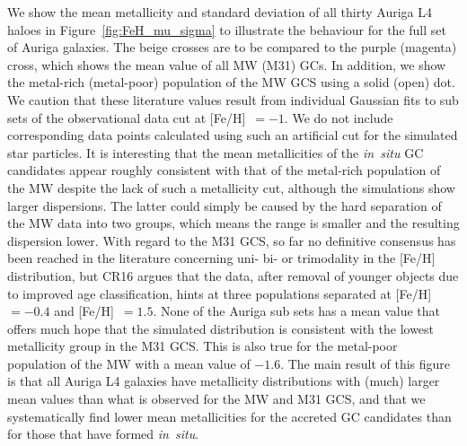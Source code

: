 \documentclass[a4paper,fleqn,usenatbib]{mnras}
\begin{document}
We show the mean metallicity and standard deviation of all thirty Auriga L4 haloes
in Figure~\ref{fig:FeH_mu_sigma} to illustrate the behaviour for the full set of Auriga
galaxies. The beige crosses are to be compared to the purple (magenta) cross, 
which shows the mean value of all MW (M31) GCs. In addition, we show the metal-rich 
(metal-poor) population of the MW GCS using a solid (open) dot. We caution that
these literature values result from individual Gaussian fits to sub sets of the 
observational data cut at [Fe/H]~$= -1$. We do not include corresponding data 
points calculated using such an artificial cut for the simulated star particles.
It is interesting that the mean metallicities of the {\it in~situ} GC candidates 
appear roughly consistent with that of the metal-rich population of the MW despite 
the lack of such a metallicity cut, although the simulations show larger dispersions. 
The latter could simply be caused by the hard separation of the MW data into two 
groups, which means the range is smaller and the resulting dispersion lower. With 
regard to the M31 GCS, so far no definitive consensus has been reached
in the literature concerning uni- bi- or trimodality in the [Fe/H] distribution, 
but CR16 argues that the data, after removal of younger objects due to improved 
age classification, hints at three populations separated at [Fe/H]~$=-0.4$ and 
[Fe/H]~$ = 1.5$. None of the Auriga sub sets has a mean value that offers much 
hope that the simulated distribution is consistent with the lowest metallicity 
group in the M31 GCS. This is also true for the metal-poor population of the 
MW with a mean value of $-1.6$. The main result of this figure is 
that all Auriga L4 galaxies have metallicity distributions with (much) larger
mean values than what is observed for the MW and M31 GCS, and that we 
systematically find lower mean metallicities for the accreted GC candidates
than for those that have formed {\it in~situ}.

\end{document}
